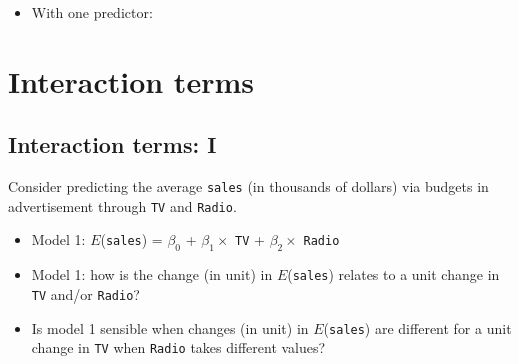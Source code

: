 \documentclass[]{article}
\newenvironment{Shaded}{\begin{snugshade}}{\end{snugshade}}
\newcommand{\KeywordTok}[1]{\textcolor[rgb]{0.13,0.29,0.53}{\textbf{{#1}}}}
\newcommand{\DataTypeTok}[1]{\textcolor[rgb]{0.13,0.29,0.53}{{#1}}}
\newcommand{\DecValTok}[1]{\textcolor[rgb]{0.00,0.00,0.81}{{#1}}}
\newcommand{\FloatTok}[1]{\textcolor[rgb]{0.00,0.00,0.81}{{#1}}}
\newcommand{\StringTok}[1]{\textcolor[rgb]{0.31,0.60,0.02}{{#1}}}
\newcommand{\NormalTok}[1]{{#1}}
\providecommand{\tightlist}{%
  \setlength{\itemsep}{0pt}\setlength{\parskip}{0pt}}
\begin{document}
\begin{Shaded}
\end{Shaded}

\begin{itemize}
\tightlist
\item
  With one predictor:
\end{itemize}

\begin{Shaded}
\end{Shaded}

\section{Interaction terms}\label{interaction-terms}

\subsection{Interaction terms: I}\label{interaction-terms-i}

Consider predicting the average \texttt{sales} (in thousands of dollars)
via budgets in advertisement through \texttt{TV} and \texttt{Radio}.

\begin{itemize}
\item
  Model 1: \(E\)(\texttt{sales}) = \(\beta_0\) + \(\beta_1 \times\)
  \texttt{TV} + \(\beta_2 \times\) \texttt{Radio}
\item
  Model 1: how is the change (in unit) in \(E\)(\texttt{sales}) relates
  to a unit change in \texttt{TV} and/or \texttt{Radio}?
\item
  Is model 1 sensible when changes (in unit) in \(E\)(\texttt{sales})
  are different for a unit change in \texttt{TV} when \texttt{Radio}
  takes different values?
\end{itemize}
\end{document}

